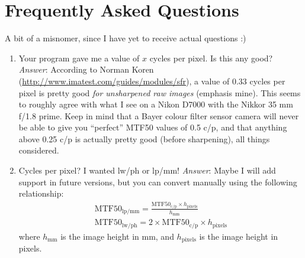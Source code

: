 \documentclass[a4paper]{article}
\begin{document}
\section{Frequently Asked Questions}
A bit of a misnomer, since I have yet to receive actual questions :)
\begin{enumerate}
  \item Your program gave me a value of $x$ cycles per pixel. Is this any
good? \emph{Answer}: According to Norman Koren
(\url{http://www.imatest.com/guides/modules/sfr}), a value of 0.33 cycles
per pixel is pretty good \emph{for unsharpened raw images} (emphasis mine).
This seems to roughly agree with what I see on a Nikon D7000 with the Nikkor
35 mm f/1.8 prime. Keep in mind that a Bayer colour filter sensor camera
will never be able to give you ``perfect'' MTF50 values of 0.5 c/p, and that
anything above 0.25 c/p is actually pretty good (before sharpening), 
all things considered.
  \item Cycles per pixel? I wanted lw/ph or lp/mm! \emph{Answer}: Maybe I
will add support in future versions, but you can convert manually using the
following relationship:
    \begin{eqnarray}
	\mathrm{MTF50}_{\mathrm{lp/mm}} = 
	  \frac{\mathrm{MTF50}_{\mathrm{c/p}} \times h_{\mathrm{pixels}}}{h_{\mathrm{mm}}} \\
        \mathrm{MTF50}_{\mathrm{lw/ph}} = 2 \times \mathrm{MTF50}_{\mathrm{c/p}} \times h_{\mathrm{pixels}} 
    \end{eqnarray}
where $h_{\mathrm{mm}}$ is the image height in mm, and $h_{\mathrm{pixels}}$
is the image height in pixels.
\end{enumerate}

\appendix
\end{document}
